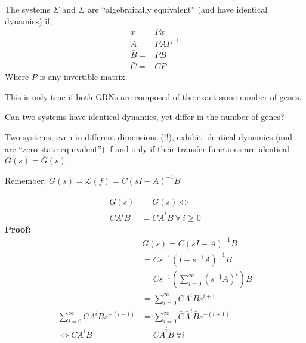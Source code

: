 \documentclass{seminar}
\begin{document}
  \begin{slide}
    The systems $\Sigma$ and $\bar{\Sigma}$ are ``algebraically equivalent'' (and have identical dynamics) if,
    \begin{equation}
      \begin{split}
        \bar{x} =& Px \\
        \bar{A} =& PAP^{-1} \\
        \bar{B} =& PB \\
        \bar{C} =& CP
      \end{split}
    \end{equation}
    Where $P$ is any invertible matrix. 

    This is only true if both GRNs are composed of the exact same number of genes. 
    
    Can two systems have identical dynamics, yet differ in the number of genes?
  \end{slide}

  \begin{slide}
    Two systems, even in different dimensions (!!), exhibit identical dynamics (and are ``zero-state equivalent'') if and only if their transfer functions are identical $G(s) = \bar{G}(s)$.

    Remember, $G(s) = \mathcal{L}(f) = C(sI-A)^{-1}B$

    \begin{equation*}
      \begin{split}
        G(s) &= \bar{G}(s) \iff \\
        CA^{i}B &= \bar{C}\bar{A}^{i}\bar{B} \ \forall \ i \geq 0
      \end{split}
    \end{equation*}
  \textbf{Proof:}
    \begin{equation*}
      \begin{split}
        &G(s) = C(sI-A)^{-1}B \\ 
        &= Cs^{-1}(I-s^{-1}A)^{-1}B \\
        &=Cs^{-1} \left( \sum_{i=0}^{\infty}(s^{-1}A)^{i}\right)B \\
        &= \sum_{i=0}^{\infty} CA^{i}Bs^{i+1} \\
        \sum_{i=0}^{\infty} CA^{i}Bs^{-(i+1)} &= \sum_{i=0}^{\infty} \bar{C}\bar{A}^{i}\bar{B}s^{-(i+1)} \\
        \iff CA^{i}B &= \bar{C}\bar{A}^{i}\bar{B} \ \forall i 
      \end{split}
    \end{equation*}
  \end{slide}
\end{document}
